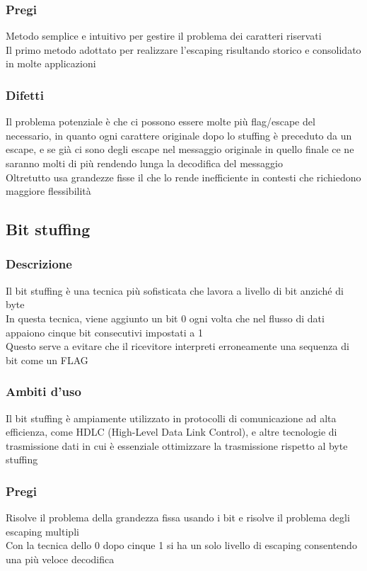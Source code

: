 \documentclass[10pt,oneside,a4paper]{article}
\begin{document}
\subsubsection{Pregi}
Metodo semplice e intuitivo per gestire il problema dei caratteri riservati\\
Il primo metodo adottato per realizzare l'escaping risultando storico e consolidato in molte applicazioni
\subsubsection{Difetti}
Il problema potenziale è che ci possono essere molte più flag/escape del necessario, in quanto ogni carattere originale dopo lo stuffing è preceduto da un escape, e se già ci sono degli escape nel messaggio originale in quello finale ce ne saranno molti di più rendendo lunga la decodifica del messaggio\\
Oltretutto usa grandezze fisse il che lo rende inefficiente in contesti che richiedono maggiore flessibilità
\subsection{Bit stuffing}
\subsubsection{Descrizione}
Il bit stuffing è una tecnica più sofisticata che lavora a livello di bit anziché di byte\\
In questa tecnica, viene aggiunto un bit 0 ogni volta che nel flusso di dati appaiono cinque bit consecutivi impostati a 1\\ Questo serve a evitare che il ricevitore interpreti erroneamente una sequenza di bit come un FLAG 
\subsubsection{Ambiti d'uso}
Il bit stuffing è ampiamente utilizzato in protocolli di comunicazione ad alta efficienza, come HDLC (High-Level Data Link Control), e altre tecnologie di trasmissione dati in cui è essenziale ottimizzare la trasmissione rispetto al byte stuffing
\subsubsection{Pregi}
Risolve il problema della grandezza fissa usando i bit e risolve il problema degli escaping multipli\\
Con la tecnica dello 0 dopo cinque 1 si ha un solo livello di escaping consentendo una più veloce decodifica
\end{document}
